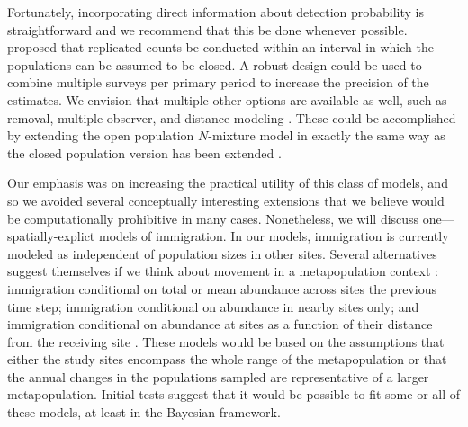 \documentclass[12pt]{article}
\begin{document}
Fortunately, incorporating direct information about detection probability 
is straightforward and we recommend that this be done whenever
possible. \citet{dail_madsen:2011} proposed that
replicated counts be conducted within an interval in which the populations can 
be assumed to be closed. A robust design \citep{pollock:1982} could be 
used to combine multiple surveys per
primary period to increase the precision of the estimates. We envision
that multiple other options are available as well, such as removal,
multiple observer, and distance modeling \citep{williams_etal:2002}. These could be
accomplished by extending the open population $N$-mixture model
in exactly the same way as the closed population version has been
extended \citep[e.g.,][]{royle_etal:2004}.

Our emphasis was on increasing the practical utility of this
class of models, and so we avoided several conceptually interesting
extensions that we believe would be computationally prohibitive in many
cases. Nonetheless, we will discuss one---spatially-explict models of
immigration. 
In our models, immigration is currently modeled as independent of
population sizes in other sites. Several alternatives suggest
themselves if we think about movement in a metapopulation
context \citep{hanski:1998}: immigration conditional on total or mean
abundance across sites the previous time step; immigration
conditional on abundance in nearby sites only; and immigration
conditional on abundance at sites as a function of their distance
from the receiving site \citep{hastings:1991,hanski:1998}. These models would
be based on the assumptions that either the study sites
encompass the whole range of the metapopulation or that the
annual changes in the populations sampled are representative of
a larger metapopulation. Initial tests suggest that it would be
possible to fit some or all of these models, at least in the
Bayesian framework.

\end{document}
